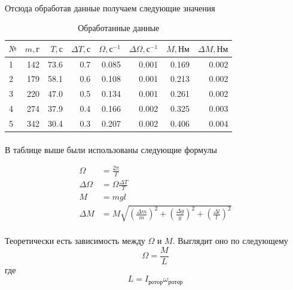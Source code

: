 \documentclass[a4paper, 12pt]{article}
\begin{document}
    \paragraph{}
    Отсюда обработав данные получаем следующие значения


    \begin{table}[h!]
        \begin{center}
        \begin{tabular}{|l|r|r|r|r|r|r|r|}
        \hline
        $№$ & $m, г$ &   $T, с$ & $\Delta T, с$ & $\Omega, с^{-1}$ & $\Delta\Omega, с^{-1}$ & $M, Нм$ & $\Delta M, Нм$\\\hline
        1 &  142 &  73.6 &    0.7 &  0.085 &  0.001 &  0.169 &  0.002 \\
        2 &  179 &  58.1 &    0.6 &  0.108 &  0.001 &  0.213 &  0.002 \\
        3 &  220 &  47.0 &    0.5 &  0.134 &  0.001 &  0.261 &  0.002 \\
        4 &  274 &  37.9 &    0.4 &  0.166 &  0.002 &  0.325 &  0.003 \\
        5 &  342 &  30.4 &    0.3 &  0.207 &  0.002 &  0.406 &  0.004 \\
        \hline
        \end{tabular}
         \caption{Обработанные данные}
        \end{center}

    \end{table}
    \paragraph{}
    В таблице выше были использованы следующие формулы

    \begin{align*}
     \Omega &= \frac{2\pi}{T}\\
     \Delta \Omega &= \Omega \frac{\Delta T}{T}\\
     M &= mgl\\
     \Delta M &= M \sqrt{\left(\frac{\Delta m}{m}\right)^2 +
                        \left(\frac{\Delta g}{g}\right)^2 +
                        \left(\frac{\Delta l}{l}\right)^2}
    \end{align*}

    \paragraph{}
    Теоретически есть зависимость между $\Omega$ и $M$. Выглядит оно по следующему
    \[\Omega = \frac{M}{L}\]
    где
    \[L = I_{ротор}\omega_{ротор}\]
\end{document}
